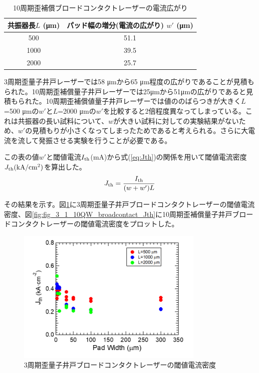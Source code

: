 \begin{table}[h]
  \caption{10周期歪補償ブロードコンタクトレーザーの電流広がり}
  \label{table:table_10QW_broadcontact_w_eff}
  \centering
  \begin{tabular}{cc}
    \hline
    共振器長$L$ (\si{\micro\metre})  & パッド幅の増分(電流の広がり) $w'$ (\si{\micro\metre})   \\
    \hline \hline
     500 & 51.1  \\
    1000  & 39.5 \\
    2000  & 25.7 \\ 
    \hline
  \end{tabular}
\end{table}

3周期歪量子井戸レーザーでは58 \si{\micro\metre}から65 \si{\micro\metre}程度の広がりであることが見積もられた。10周期歪補償量子井戸レーザーでは25\si{ \micro\metre}から51\si{ \micro\metre}の広がりであると見積もられた。10周期歪補償値量子井戸レーザーでは値ののばらつきが大きく$L$=500 \si{\micro\metre}の$w'$と$L$=2000 \si{\micro\metre}の$w'$を比較すると2倍程度異なってしまっている。これは共振器の長い試料について、$w$が大きい試料に対しての実験結果がないため、$w'$の見積もりが小さくなってしまったためであると考えられる。さらに大電流を流して発振させる実験を行うことが必要である。


この表の値$w'$と閾値電流$I_{\rm{th}}$(mA)から式(\ref{eq:Jth})の関係を用いて閾値電流密度$J_{\rm{th}} \rm{(kA/cm^2)}$を算出した。
\begin{eqnarray}
J_{\rm{th}}=\dfrac{I_{\rm{th}}}{(w+w')L}
\label{eq:Jth}
\end{eqnarray}

その結果を示す。図\ref{fig:fig_3_1_3QW_broadcontact_Jth}に3周期歪量子井戸ブロードコンタクトレーザーの閾値電流密度、図\ref{fig:fig_3_1_10QW_broadcontact_Jth}に10周期歪補償量子井戸ブロードコンタクトレーザーの閾値電流密度をプロットした。

\begin{figure}[h]
	\centering
	\includegraphics[width=9cm]{figure/fig_3_1_3QW_broadcontact_Jth.png}
		\caption{3周期歪量子井戸ブロードコンタクトレーザーの閾値電流密度}
		\label{fig:fig_3_1_3QW_broadcontact_Jth}
\end{figure}

